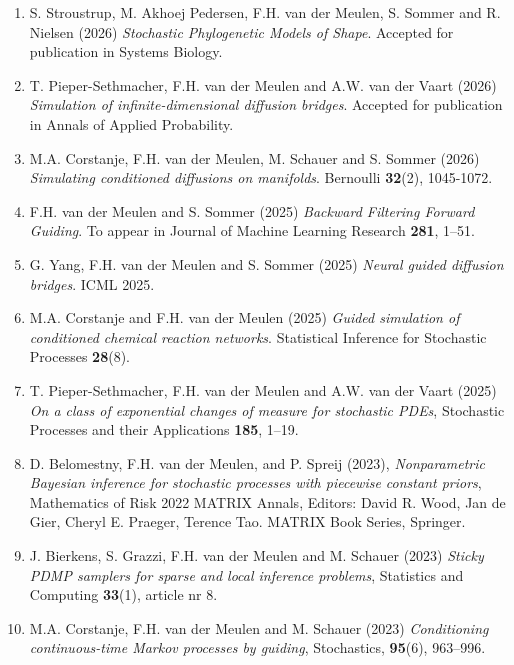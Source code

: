 \documentclass[
10pt, %
a4paper, %
oneside, %
headinclude,footinclude, %
BCOR5mm, %
]{scrartcl}
\begin{document}
\begin{enumerate}

\item {\sc S. Stroustrup, M. Akhoej Pedersen, F.H. van der Meulen, S. Sommer and R. Nielsen} (2026) {\it Stochastic Phylogenetic Models of Shape}. Accepted for publication in Systems Biology.

\item {\sc T. Pieper-Sethmacher, F.H. van der Meulen and A.W. van der Vaart} (2026) {\it Simulation of infinite-dimensional diffusion bridges}. Accepted for publication in Annals of Applied Probability.


\item {\sc M.A. Corstanje, F.H. van der Meulen, M. Schauer and S. Sommer} (2026) {\it Simulating conditioned diffusions on manifolds}.  Bernoulli {\bf 32}(2), 1045-1072.

\item {\sc F.H. van der Meulen and S. Sommer} (2025) {\it Backward Filtering Forward Guiding}. To appear in Journal of Machine Learning Research {\bf 281}, 1--51.


\item {\sc G. Yang, F.H. van der Meulen and S. Sommer} (2025) {\it Neural guided diffusion bridges}. ICML 2025.

\item {\sc M.A. Corstanje and F.H. van der Meulen} (2025) {\it Guided simulation of conditioned chemical reaction networks}. Statistical Inference for Stochastic Processes {\bf 28}(8). 

\item {\sc T. Pieper-Sethmacher, F.H. van der Meulen and A.W. van der Vaart} (2025) {\it On a class of exponential changes of measure for stochastic PDEs},  Stochastic Processes and their Applications {\bf 185}, 1--19. 

\item {\sc D. Belomestny, F.H. van der Meulen, and P. Spreij} (2023), {\it Nonparametric Bayesian inference for stochastic processes with piecewise constant priors}, Mathematics of Risk 2022 MATRIX Annals, Editors: David R. Wood, Jan de Gier, Cheryl E. Praeger, Terence Tao. MATRIX Book Series, Springer.

\item {\sc J. Bierkens, S. Grazzi, F.H. van der Meulen and M. Schauer} (2023) {\it  Sticky PDMP samplers for sparse and local inference problems},  Statistics and Computing {\bf 33}(1), article nr 8. 

\item {\sc M.A. Corstanje, F.H. van der Meulen and M. Schauer} (2023) {\it  Conditioning continuous-time Markov processes by guiding}, Stochastics, {\bf 95}(6), 963--996.


\end{enumerate}
\end{document}
